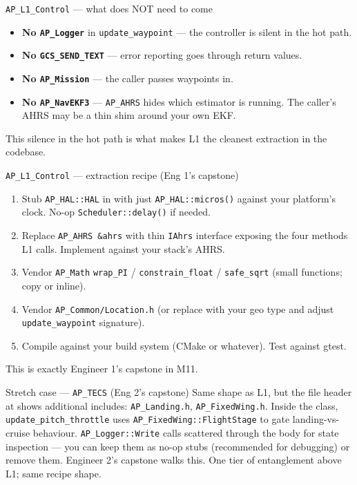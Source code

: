 \documentclass[aspectratio=169,11pt]{beamer}
\begin{document}
\begin{frame}{\texttt{AP\_L1\_Control} --- what does NOT need to come}
  \begin{itemize}
    \item \textbf{No \texttt{AP\_Logger}} in \texttt{update\_waypoint} --- the controller is silent in the hot path.
    \item \textbf{No \texttt{GCS\_SEND\_TEXT}} --- error reporting goes through return values.
    \item \textbf{No \texttt{AP\_Mission}} --- the caller passes waypoints in.
    \item \textbf{No \texttt{AP\_NavEKF3}} --- \texttt{AP\_AHRS} hides which estimator is running. The caller's AHRS may be a thin shim around your own EKF.
  \end{itemize}
  \vfill
  This silence in the hot path is what makes L1 the cleanest extraction in the codebase.
\end{frame}

\begin{frame}{\texttt{AP\_L1\_Control} --- extraction recipe (Eng 1's capstone)}
  \begin{enumerate}
    \item Stub \texttt{AP\_HAL::HAL} in  with just \texttt{AP\_HAL::micros()} against your platform's clock. No-op \texttt{Scheduler::delay()} if needed.
    \item Replace \texttt{AP\_AHRS \&ahrs} with thin \texttt{IAhrs} interface exposing the four methods L1 calls. Implement against your stack's AHRS.
    \item Vendor \texttt{AP\_Math} \texttt{wrap\_PI} / \texttt{constrain\_float} / \texttt{safe\_sqrt} (small functions; copy or inline).
    \item Vendor \texttt{AP\_Common/Location.h} (or replace with your geo type and adjust \texttt{update\_waypoint} signature).
    \item Compile against your build system (CMake or whatever). Test against gtest.
  \end{enumerate}
  \vfill
  This is exactly Engineer 1's capstone in M11.
\end{frame}

\begin{frame}{Stretch case --- \texttt{AP\_TECS} (Eng 2's capstone)}
  Same shape as L1, but the file header at  shows additional includes: \texttt{AP\_Landing.h}, \texttt{AP\_FixedWing.h}.
  \vfill
  Inside the class, \texttt{update\_pitch\_throttle} uses \texttt{AP\_FixedWing::FlightStage} to gate landing-vs-cruise behaviour.
  \vfill
  \texttt{AP\_Logger::Write} calls scattered through the body for state inspection --- you can keep them as no-op stubs (recommended for debugging) or remove them.
  \vfill
  Engineer 2's capstone walks this. One tier of entanglement above L1; same recipe shape.
\end{frame}
\end{document}
